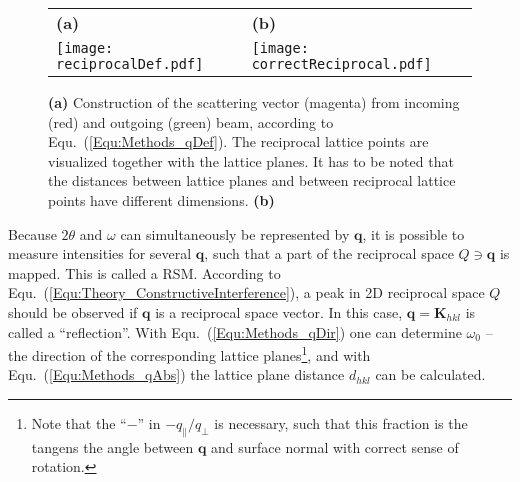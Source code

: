 \begin{figure}
    \centering
    \begin{tabular}{ll}
        \textbf{(a)}&\textbf{(b)}\\
        \texttt{[image: reciprocalDef.pdf]}
        &\texttt{[image: correctReciprocal.pdf]}
    \end{tabular}
    \caption{\textbf{(a)} Construction of the scattering vector (magenta) from incoming (red) and outgoing (green) beam, according to Equ.~(\ref{Equ:Methods_qDef}).
    The reciprocal lattice points are visualized together with the lattice planes.
    It has to be noted that the distances between lattice planes and between reciprocal lattice points have different dimensions.
    \textbf{(b)}}
    \label{Fig:Methods_qDef}
\end{figure} 
Because $2\theta$ and $\omega$ can simultaneously be represented by $\mathbf{q}$, it is possible to measure intensities for several $\mathbf{q}$, such that a part of the reciprocal space $Q\ni\mathbf{q}$ is mapped.
This is called a \gls{RSM}.
According to Equ.~(\ref{Equ:Theory_ConstructiveInterference}), a peak in 2D reciprocal space $Q$ should be observed if $\mathbf{q}$ is a reciprocal space vector.
In this case, $\mathbf{q}=\mathbf{K}_{hkl}$ is called a \enquote{reflection}.
With Equ.~(\ref{Equ:Methods_qDir}) one can determine $\omega_0$ -- the direction of the corresponding lattice planes\footnote{
    Note that the \enquote{$-$} in $-q_\parallel/q_\perp$ is necessary, such that this fraction is the tangens the angle between $\mathbf{q}$ and surface normal with correct sense of rotation. 
}, and with Equ.~(\ref{Equ:Methods_qAbs}) the lattice plane distance $d_{hkl}$ can be calculated.

